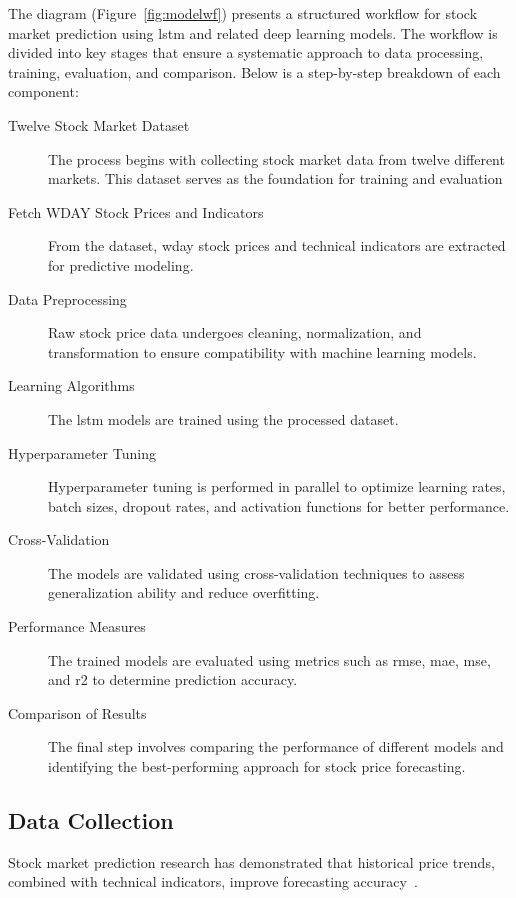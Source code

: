 The diagram (Figure~\ref{fig:modelwf}) presents a structured workflow for stock market prediction 
using \acrshort{lstm} and related deep learning models. The workflow is divided into key stages that
ensure a systematic approach to data processing, training, evaluation, and comparison. Below is a 
step-by-step breakdown of each component:

\begin{description}
    \item[Twelve Stock Market Dataset] The process begins with collecting stock market data from
         twelve different markets. This dataset serves as the foundation for training and evaluation
    \item[Fetch WDAY Stock Prices and Indicators]  From the dataset, \acrshort{wday} stock prices 
         and technical indicators are extracted for predictive modeling.
    \item[Data Preprocessing] Raw stock price data undergoes cleaning, normalization, and 
         transformation to ensure compatibility with machine learning models.
    \item[Learning Algorithms] The \acrshort{lstm} models are trained using the processed dataset.
    \item[Hyperparameter Tuning] Hyperparameter tuning is performed in parallel to optimize
        learning rates, batch sizes, dropout rates, and activation functions for better performance.
    \item[Cross-Validation] The models are validated using cross-validation techniques to assess 
         generalization ability and reduce overfitting.     
    \item[Performance Measures] The trained models are evaluated using metrics such as 
         \acrshort{rmse}, \acrshort{mae}, \acrshort{mse}, and \acrshort{r2} to determine 
         prediction accuracy.
    \item[Comparison of Results] The final step involves comparing the performance of 
         different models and identifying the best-performing approach for stock price forecasting.
\end{description}

\subsection{Data Collection}

Stock market prediction research has demonstrated that historical price trends, combined 
with technical indicators, improve forecasting accuracy~\parencite{guo2024LSTMStock,
agrawal2022StockPrediction,balasubramanian2023SystematicSurvey,phuoc2024StockPrediction}. 

